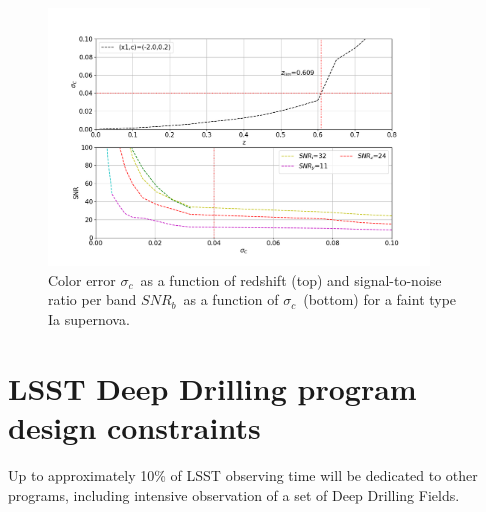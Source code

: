 \documentclass[\docopts]{\docclass}
\newcommand{\snrb}{{$SNR_b$}}
\newcommand{\sigc}{{$\sigma_c$}}
\begin{document}
\begin{figure}[htbp]
\begin{center}
  \includegraphics[width=0.9\textwidth]{sigmaC_z.png}
 \caption{Color error \sigc~as a function of redshift (top) and signal-to-noise ratio per band \snrb~as a function of \sigc~(bottom) for a faint type Ia supernova.}\label{fig:sigc_z}
\end{center}
\end{figure}


\section{LSST Deep Drilling program design constraints}
\label{sec:design}

Up to approximately 10\% of LSST observing time will be dedicated to other programs, including intensive observation of a set of Deep Drilling Fields. 
\end{document}
